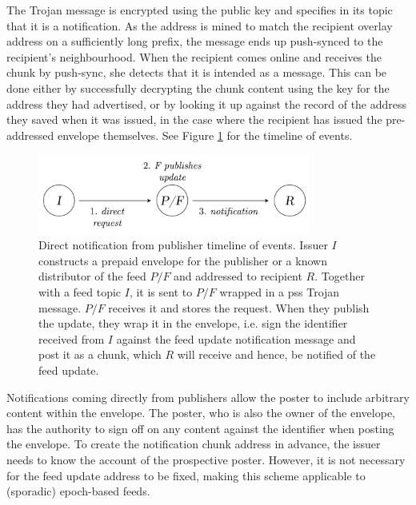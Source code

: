The Trojan message is encrypted using the public key and specifies in its topic that it is a notification. As the address is mined to match the recipient overlay address on a sufficiently long prefix, the message ends up push-synced to the recipient's neighbourhood. When the recipient comes online and receives the chunk by push-sync, she detects that it is intended as a message. This can be done either by successfully decrypting the chunk content using the key for the address they had advertised, or by looking it up against the record of the address they saved when it was issued, in the case where the recipient has issued the pre-addressed envelope themselves. See Figure \ref{fig:direct-notification-events} for the timeline of events.


\begin{figure}[htbp]
   \centering
    \includegraphics[width=0.8\textwidth]{fig/direct-notification-events.pdf}
   \caption[Direct notification from publisher timeline of events \statusgreen]{Direct notification from publisher timeline of events. Issuer $I$ constructs a prepaid envelope for the publisher or a known distributor of the feed $P/F$ and addressed to recipient $R$. Together with a feed topic $I$, it is sent to $P/F$ wrapped in a pss Trojan message. $P/F$ receives it and stores the request. When they publish the update, they wrap it in the envelope, i.e. sign the identifier received from $I$ against the feed update notification message and post it as a chunk, which $R$ will receive and hence, be notified of the feed update. }
   \label{fig:direct-notification-events}
\end{figure}


Notifications coming directly from publishers allow the poster to include arbitrary content within the envelope. The poster, who is also the owner of the envelope, has the authority to sign off on any content against the identifier when posting the envelope. To create the notification chunk address in advance, the issuer needs to know the account of the prospective poster. However, it is not necessary for the feed update address to be fixed, making this scheme applicable to (sporadic) epoch-based feeds.

